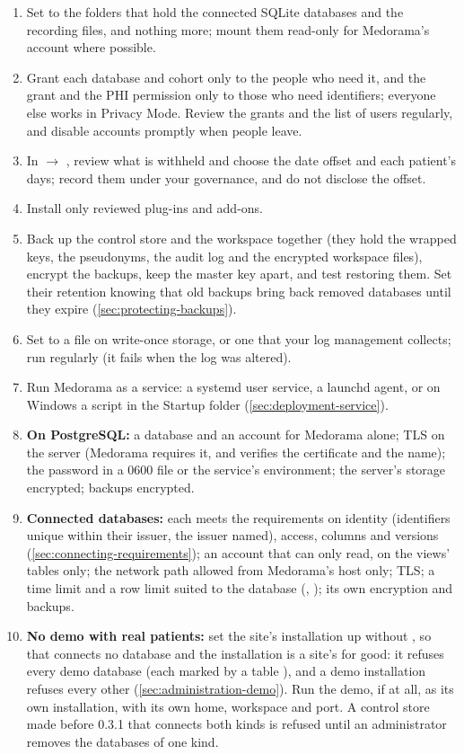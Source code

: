 \begin{enumerate}
\item Set  to the folders that hold the connected SQLite databases and the
  recording files, and nothing more; mount them read-only for Medorama's account where possible.
\item Grant each database and cohort only to the people who need it, and the  grant and
  the PHI permission only to those who need identifiers; everyone else works in Privacy Mode.
  Review the grants and the list of users regularly, and disable accounts promptly when people
  leave.
\item In  $\rightarrow$ , review what is withheld and choose the date
  offset and each patient's days; record them under your governance, and do not disclose the
  offset.
\item Install only reviewed plug-ins and add-ons.
\item Back up the control store and the workspace together (they hold the wrapped keys, the
  pseudonyms, the audit log and the encrypted workspace files), encrypt the backups, keep the
  master key apart, and test restoring them. Set their retention knowing that old backups bring
  back removed databases until they expire (\cref{sec:protecting-backups}).
\item Set  to a file on write-once storage, or one that your log management
  collects; run  regularly (it fails when the log was altered).
\item Run Medorama as a service: a systemd user service, a launchd agent, or on Windows a script
  in the Startup folder (\cref{sec:deployment-service}).
\item \textbf{On PostgreSQL:} a database and an account for Medorama alone; TLS on the server
  (Medorama requires it, and verifies the certificate and the name); the password in a 0600 file
  or the service's environment; the server's storage encrypted;  backups encrypted.
\item \textbf{Connected databases:} each meets the requirements on identity (identifiers unique
  within their issuer, the issuer named), access, columns and versions
  (\cref{sec:connecting-requirements}); an account that can only read, on the views' tables only;
  the network path allowed from Medorama's host only; TLS; a time limit and a row limit suited to
  the database (, ); its own encryption and backups.
\item \textbf{No demo with real patients:} set the site's installation up without
  , so that  connects no database and the installation is a site's for
  good: it refuses every demo database (each marked by a table ), and a demo
  installation refuses every other (\cref{sec:administration-demo}). Run the demo, if at all, as
  its own installation, with its own home, workspace and port. A control store made before 0.3.1
  that connects both kinds is refused until an administrator removes the databases of one kind.
\end{enumerate}


